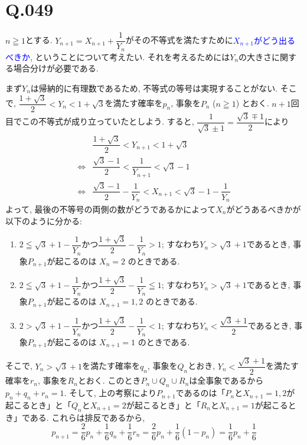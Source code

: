 \documentclass[dvipdfmx]{jbook}
\theoremstyle{definition}
\renewcommand{\leq}{\leqq}
\renewcommand{\geq}{\geqq}
\newcommand{\ao}[1]{\textcolor{blue}{#1}}
\begin{document}
\twocolumn



\section{Q.049}

$n\geq 1$とする.  $Y_{n+1} = X_{n+1} + \dfrac{1}{Y_n}$がその不等式を満たすために\ao{$X_{n+1}$がどう出るべきか}, ということについて考えたい. それを考えるためには$Y_n$の大きさに関する場合分けが必要である. \par 
まず$Y_n$は帰納的に有理数であるため, 不等式の等号は実現することがない. そこで, $\dfrac{1+\sqrt{3}}{2} < Y_n < 1+\sqrt{3}$を満たす確率を$p_n$, 事象を$P_n$ ($n\geq 1$) とおく. $n+1$回目でこの不等式が成り立っていたとしよう. すると, $\dfrac{1}{\sqrt{3} \pm 1} = \dfrac{\sqrt{3}\mp 1}{2}$により
\begin{align*}
&\dfrac{1+\sqrt{3}}{2} < Y_{n+1} < 1 + \sqrt{3}\\
\iff& \dfrac{\sqrt{3}-1}{2} < \dfrac{1}{Y_{n+1}} < \sqrt{3} - 1 \\
\iff& \dfrac{\sqrt{3}-1}{2} - \dfrac{1}{Y_n} < X_{n+1} < \sqrt{3} - 1 - \dfrac{1}{Y_n}
\end{align*}
よって, 最後の不等号の両側の数がどうであるかによって$X_n$がどうあるべきかが以下のように分かる: 
\begin{enumerate}[label=(\roman*)]
\item $2\leq \sqrt{3} + 1 - \dfrac{1}{Y_n}$かつ$\dfrac{1+\sqrt{3}}{2} - \dfrac{1}{Y_n} > 1$; すなわち$Y_n > \sqrt{3}+1$であるとき, 事象$P_{n+1}$が起こるのは $X_n = 2$ のときである. 
\item $2\leq \sqrt{3} + 1 - \dfrac{1}{Y_n}$かつ$\dfrac{1+\sqrt{3}}{2} - \dfrac{1}{Y_n} \leq 1$; すなわち$Y_n > \sqrt{3}+1$であるとき, 事象$P_{n+1}$が起こるのは $X_{n+1} = 1,2$ のときである. 
\item $2> \sqrt{3} + 1 - \dfrac{1}{Y_n}$かつ$\dfrac{1+\sqrt{3}}{2} - \dfrac{1}{Y_n} < 1$; すなわち$Y_n < \dfrac{\sqrt{3}+1}{2}$であるとき, 事象$P_{n+1}$が起こるのは $X_{n+1} = 1$ のときである. 
\end{enumerate}
そこで, $Y_n > \sqrt{3}+1$を満たす確率を$q_n$, 事象を$Q_n$とおき, $Y_n < \dfrac{\sqrt{3}+1}{2}$を満たす確率を$r_n$, 事象を$R_n$とおく. このとき$P_n \cup Q_n \cup R_n$は全事象であるから$p_n + q_n + r_n = 1$. そして, 上の考察により$P_{n+1}$であるのは「$P_n$と$X_{n+1} = 1,2$が起こるとき」と「$Q_{n}$と$X_{n+1}=2$が起こるとき」と「$R_n$と$X_{n+1} = 1$が起こるとき」である. これらは排反であるから, 
\[p_{n+1} = \dfrac{2}{6}p_n + \dfrac{1}{6}q_n + \dfrac{1}{6}r_n = \dfrac{2}{6}p_n + \dfrac{1}{6
}(1-p_n) = \dfrac{1}{6}p_n+ \dfrac{1}{6}\]
\end{document}
